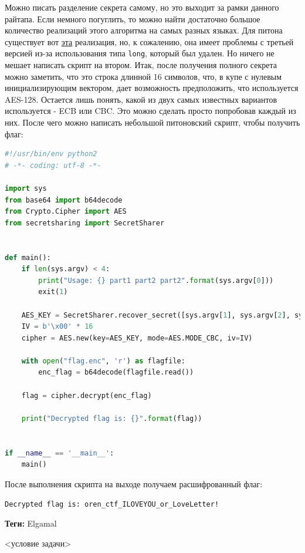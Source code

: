\documentclass[idxtotoc,hyperref,openany,oneside]{files/crypto} %
\begin{document}
Можно писать разделение секрета самому, но это выходит за рамки данного райтапа. Если немного погуглить, то можно найти достаточно большое количество реализаций этого алгоритма на самых разных языках. Для питона существует вот \href{https://github.com/shea256/secret-sharing}{эта} реализация, но, к сожалению, она имеет проблемы с третьей версией из-за использования типа \verb|long|, который был удален. Но ничего не мешает написать скрипт на втором. Итак, после получения полного секрета можно заметить, что это строка длинной 16 символов, что, в купе с нулевым инициализирующим вектором, дает возможность предположить, что используется AES-128. Остается лишь понять, какой из двух самых известных вариантов используется - ECB или CBC. Это можно сделать просто попробовав каждый из них. После чего можно написать небольшой питоновский скрипт, чтобы получить флаг:
\begin{lstlisting}[language=Python, caption=Расшифровка флага AES-CBC]
#!/usr/bin/env python2
# -*- coding: utf-8 -*-

import sys
from base64 import b64decode
from Crypto.Cipher import AES
from secretsharing import SecretSharer


def main():
    if len(sys.argv) < 4:
        print("Usage: {} part1 part2 part2".format(sys.argv[0]))
        exit(1)

    AES_KEY = SecretSharer.recover_secret([sys.argv[1], sys.argv[2], sys.argv[3]])
    IV = b'\x00' * 16
    cipher = AES.new(key=AES_KEY, mode=AES.MODE_CBC, iv=IV)

    with open("flag.enc", 'r') as flagfile:
        enc_flag = b64decode(flagfile.read())

    flag = cipher.decrypt(enc_flag)

    print("Decrypted flag is: {}".format(flag))


if __name__ == '__main__':
    main()
\end{lstlisting}

После выполнения скрипта на выходе получаем расшифрованный флаг: 

\verb|Decrypted flag is: oren_ctf_ILOVEYOU_or_LoveLetter!|




\textbf{Теги:} Elgamal\vspace{\baselineskip}

\begin{tcolorbox}
<условие задачи>
\end{tcolorbox}
\end{document}
